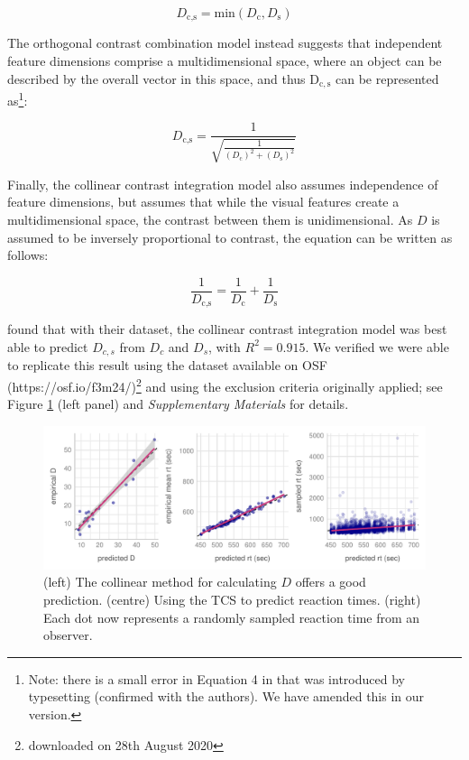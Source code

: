 \documentclass[preprint,12pt,authoryear]{elsarticle}
\begin{document}
\begin{equation}
D_\text{c,s} = \text{min}\left(D_\text{c}, D_\text{s}\right)
\label{eq:bestfeature}
\end{equation}

The orthogonal contrast combination model instead suggests that independent feature dimensions comprise a multidimensional space, where an object can be described by the overall vector in this space, and thus $\mathrm{D_{c,s}}$ can be represented as\footnote{Note: there is a small error in Equation 4 in \cite{buetti2019predicting} that was introduced by typesetting (confirmed with the authors). We have amended this in our version.}:

\begin{equation}
D_\text{c,s} = \frac{1}{\sqrt{\frac{1}{(D_\text{c})^2 + (D_\text{s})^2}}}
\label{eq:orthogonalcontrast}
\end{equation}

Finally, the collinear contrast integration model also assumes independence of feature dimensions, but assumes that while the visual features create a multidimensional space, the contrast between them is unidimensional. As $D$ is assumed to be inversely proportional to contrast, the equation can be written as follows:

\begin{equation}
\frac{1}{D_\text{c,s}} = \frac{1}{D_\text{c}} + \frac{1}{D_\text{s}}
\label{eq:collinearcontrast}
\end{equation}

\cite{buetti2019predicting} found that with their dataset, the collinear contrast integration model was best able to predict $D_{c,s}$ from $D_c$ and $D_s$, with $R^2 = 0.915$. We verified we were able to replicate this result using the dataset available on OSF (https://osf.io/f3m24/)\footnote{downloaded on 28th August 2020} and using the exclusion criteria originally applied; see Figure \ref{fig:comp_rep} (left panel) and \textit{Supplementary Materials} for details.

\begin{figure}
\centering
\includegraphics[width=\textwidth]{../plots/computational_replication.pdf}
\caption{(left) The collinear method for calculating $D$ offers a good prediction. (centre) Using the TCS to predict reaction times. (right) Each dot now represents a randomly sampled reaction time from an observer.}
\label{fig:comp_rep}
\end{figure}
\end{document}
